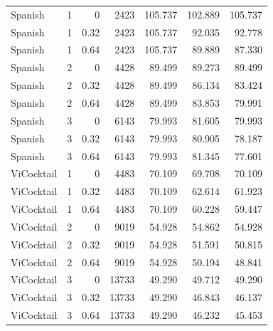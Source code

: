 \begin{longtable}{lrrrrrr}
Spanish & 1 & 0 & 2423 & 105.737 & 102.889 & 105.737 \\
Spanish & 1 & 0.32 & 2423 & 105.737 & 92.035 & 92.778 \\
Spanish & 1 & 0.64 & 2423 & 105.737 & 89.889 & 87.330 \\
Spanish & 2 & 0 & 4428 & 89.499 & 89.273 & 89.499 \\
Spanish & 2 & 0.32 & 4428 & 89.499 & 86.134 & 83.424 \\
Spanish & 2 & 0.64 & 4428 & 89.499 & 83.853 & 79.991 \\
Spanish & 3 & 0 & 6143 & 79.993 & 81.605 & 79.993 \\
Spanish & 3 & 0.32 & 6143 & 79.993 & 80.905 & 78.187 \\
Spanish & 3 & 0.64 & 6143 & 79.993 & 81.345 & 77.601 \\
ViCocktail & 1 & 0 & 4483 & 70.109 & 69.708 & 70.109 \\
ViCocktail & 1 & 0.32 & 4483 & 70.109 & 62.614 & 61.923 \\
ViCocktail & 1 & 0.64 & 4483 & 70.109 & 60.228 & 59.447 \\
ViCocktail & 2 & 0 & 9019 & 54.928 & 54.862 & 54.928 \\
ViCocktail & 2 & 0.32 & 9019 & 54.928 & 51.591 & 50.815 \\
ViCocktail & 2 & 0.64 & 9019 & 54.928 & 50.194 & 48.841 \\
ViCocktail & 3 & 0 & 13733 & 49.290 & 49.712 & 49.290 \\
ViCocktail & 3 & 0.32 & 13733 & 49.290 & 46.843 & 46.137 \\
ViCocktail & 3 & 0.64 & 13733 & 49.290 & 46.232 & 45.453 \\
\end{longtable}
\endgroup
